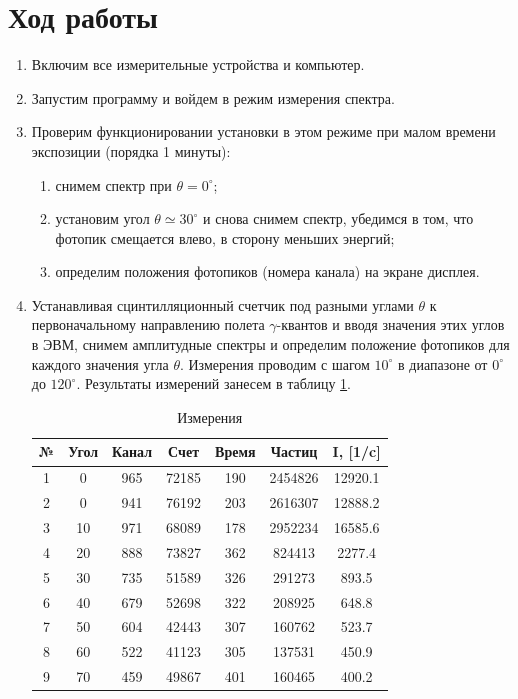 \documentclass[a4paper, 12pt]{article}
\begin{document}
\section{Ход работы}
\begin{enumerate}
	\item Включим все измерительные устройства и компьютер.
	\item Запустим программу и войдем в режим измерения спектра.
	\item Проверим функционировании установки в этом режиме при малом времени экспозиции (порядка 1 минуты):
	\begin{enumerate}
		\item снимем спектр при $\theta=0^\circ$;
		\item установим угол $\theta\simeq 30^\circ$ и снова снимем спектр, убедимся в том, что фотопик смещается влево, в сторону меньших энергий;
		\item определим положения фотопиков (номера канала) на экране дисплея.
	\end{enumerate}
	\item Устанавливая сцинтилляционный счетчик под разными углами $\theta$ к первоначальному направлению полета $\gamma$-квантов и вводя значения этих углов в ЭВМ, снимем амплитудные спектры и определим положение фотопиков для каждого значения угла $\theta$. Измерения проводим с шагом $10^\circ$ в диапазоне от $0^\circ$ до $120^\circ$. Результаты измерений занесем в таблицу \ref{expdata}.
	\begin{table}[!htb]
		\centering
		\caption{Измерения}
		\label{expdata}
		\begin{tabular}{|c|c|c|c|c|c|c|}
			\hline
			№ & Угол & Канал & Счет & Время & Частиц & I, [1/c]\\
			\hline
			1 & 0 & 965 & 72185 & 190 & 2454826 & 12920.1 \\
			2 & 0 & 941 & 76192 & 203 & 2616307 & 12888.2 \\
			3 & 10 & 971 & 68089 & 178 & 2952234 & 16585.6 \\
 			4 & 20 & 888 & 73827 & 362 & 824413 & 2277.4 \\
 			5 & 30 & 735 & 51589 & 326 & 291273 & 893.5 \\
 			6 & 40 & 679 & 52698 & 322 & 208925 & 648.8 \\
 			7 & 50 & 604 & 42443 & 307 & 160762 & 523.7 \\
 			8 & 60 & 522 & 41123 & 305 & 137531 & 450.9 \\
 			9 & 70 & 459 & 49867 & 401 & 160465 & 400.2 \\

\end{tabular}
\end{table}
\end{enumerate}
\end{document}
